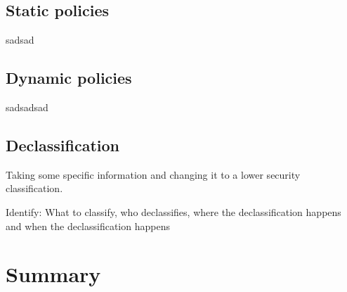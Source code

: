 \subsection{Static policies}


sadsad
\subsection{Dynamic policies}
sadsadsad


\subsection{Declassification}
Taking some specific information and changing it to a lower security classification.

Identify: What to classify, who declassifies, where the declassification happens and when the declassification happens

\section{Summary}
